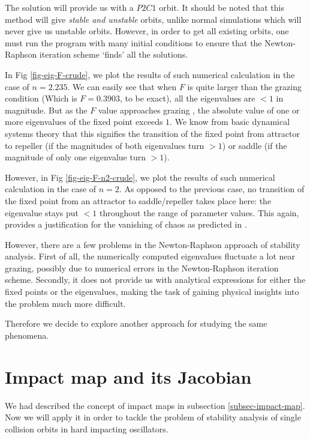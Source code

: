 \documentclass{book}
\renewcommand{\(}{\begin{columns}}
\renewcommand{\)}{\end{columns}}
\newcommand{\<}[1]{\begin{column}{#1}}
\renewcommand{\>}{\end{column}}
\begin{document}
The solution will provide us with a $P2C1$ orbit.  It should be noted that 
this method will give \emph{stable and unstable} orbits, unlike normal 
simulations which will never give us unstable orbits.  However, in order to 
get all existing orbits, one must run the program with many initial conditions 
to ensure that the Newton-Raphson iteration scheme `finds' all the solutions.  


In Fig \ref{fig-eig-F-crude}, we plot the results of such numerical 
calculation in the case of $n=2.235$.  We can easily see that when $F$ is 
quite larger than the grazing condition (Which is $F=0.3903$, to be exact), all the 
eigenvalues are $<1$ in magnitude.  But as the $F$ value 
approaches grazing , the absolute value of one or more eigenvalues of the 
fixed point exceeds $1$.  We know from basic dynamical systems theory that 
this signifies the transition of the fixed point from attractor to repeller 
(if the magnitudes of both eigenvalues turn $>1$) or saddle (if the magnitude 
of only one  eigenvalue turn $>1$). 


However, in Fig \ref{fig-eig-F-n2-crude}, we plot the results of such numerical 
calculation in the case of $n=2$. As opposed to the previous case, no 
transition of the fixed point from an attractor to saddle/repeller takes place 
here: the eigenvalue stays put $<1$ throughout the range of parameter values. 
This again, provides a justification for the vanishing of chaos as predicted 
in \cite{banerjee-kundu-soft} . 

However, there are a few problems in the Newton-Raphson approach of stability 
analysis.  First of all, the numerically computed eigenvalues fluctuate a lot 
near grazing, possibly due to numerical errors in the Newton-Raphson iteration 
scheme.  Secondly, it does not provide us with analytical expressions for 
either the fixed points or the eigenvalues, making the task of gaining 
physical insights into the problem much more difficult.  

Therefore we decide to explore another approach for studying the same 
phenomena.  

\section{Impact map and its Jacobian}
We had described the concept of impact maps in subsection 
\ref{subsec-impact-map}. Now we will apply it in order to tackle the problem of 
stability analysis of single collision orbits in hard impacting oscillators.  
\end{document}
